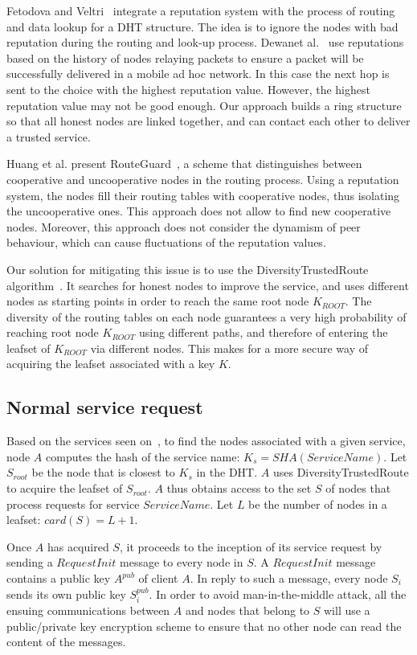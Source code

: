 Fetodova and Veltri~\cite{fedotova2009reputation} integrate a
reputation system with the process of routing and data lookup
for a DHT structure. The idea is to ignore the nodes with
bad reputation during the routing and look-up process.  Dewanet al.~\cite{dewan2004using} use reputations based on the history of
nodes relaying packets to ensure a packet will be successfully
delivered in a mobile ad hoc network. In this case the next
hop is sent to the choice with the highest reputation value.
However, the highest reputation value may not be good enough.
Our approach builds a ring structure so that all honest nodes are
linked together, and can contact each other to deliver a trusted
service.

Huang et al. present RouteGuard~\cite{huang2010routeguard}, a scheme that
distinguishes between cooperative and uncooperative nodes in
the routing process. Using a reputation system, the nodes fill
their routing tables with cooperative nodes, thus isolating the
uncooperative ones. This approach does not
allow to find new cooperative nodes. Moreover, this approach
does not consider the dynamism of peer behaviour, which can
cause fluctuations of the reputation values.

Our solution for mitigating this issue is to use the DiversityTrustedRoute
algorithm~\cite{rosas2011corps}. It searches for honest nodes to improve the
service, and uses different
nodes as starting points in order to reach the same root node $K_{ROOT}$. The
diversity of the routing tables on each node guarantees a very high probability
of reaching root node $K_{ROOT}$ using different paths, and therefore of
entering the leafset of $K_{ROOT}$ via different nodes. This makes for a more
secure way of acquiring the leafset associated with a key $K$.

\subsection{Normal service request}

Based on the services seen on~\cite{p2p_certification}, to find the nodes associated with a given
service, node $A$ computes the hash
of the service name: $K_s = SHA(ServiceName)$. Let $S_{root} $ be the node that
is closest to $K_s$ in the DHT. $A$ uses DiversityTrustedRoute to acquire the
leafset of $S_{root}$. $A$ thus obtains access to the set $S$ of nodes that
process requests for service $ServiceName$. Let $L$ be the number of nodes in a
leafset: $card(S) = L + 1$.

Once $A$ has acquired $S$, it proceeds to the inception of its service request
by sending a $RequestInit$ message to every node in $S$. A $RequestInit$
message contains a public key $A^{pub}$ of client $A$. In reply to such a
message, every node $S_i$ sends its own public key $S^{pub}_i$. In order to
avoid man-in-the-middle attack, all the ensuing communications between $A$ and
nodes that belong to $S$ will use a public/private key encryption scheme to
ensure that no other node can read the content of the messages.

